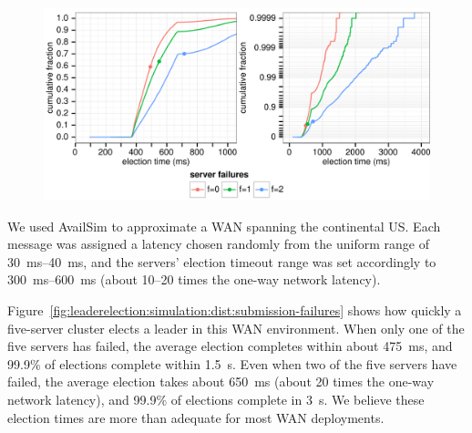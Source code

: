\begin{figure}[p]
\centering
\includegraphics{leaderelection/multi-submission-failures-logsdiff}
\vspace{-4ex}
\label{fig:leaderelection:simulation:dist:submission-failures-logsdiff}
\end{figure}

We used AvailSim to approximate a WAN spanning the continental US. Each
message was assigned a latency chosen randomly from the uniform range of
\SIrange{30}{40}{\milli\second}, and the servers' election timeout range was set
accordingly to \SIrange{300}{600}{\milli\second} (about 10--20 times the
one-way network latency).

Figure~\ref{fig:leaderelection:simulation:dist:submission-failures} shows
how quickly a five-server cluster elects a leader in this WAN
environment. When only one of the five servers has failed, the average
election completes within about
\SI{475}{\milli\second}, and 99.9\% of
elections complete within
\SI{1.5}{\second}. Even when two of the five servers
have failed, the average election takes about
\SI{650}{\milli\second} (about 20
times the one-way network latency), and 99.9\%
of elections complete in
\SI{3}{\second}. We believe these election times are more than adequate for
most WAN deployments.
